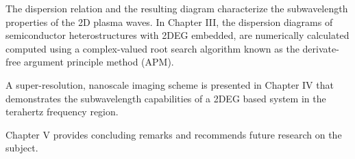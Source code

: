 \documentclass[12pt]{article}
\begin{document}
The dispersion relation and the resulting diagram characterize the subwavelength properties of the 2D plasma waves. In Chapter III, the dispersion diagrams of semiconductor heterostructures with 2DEG embedded, are numerically calculated computed using a complex-valued root search algorithm known as the derivate-free argument principle method (APM).

A super-resolution, nanoscale imaging scheme is presented in Chapter IV that demonstrates the subwavelength capabilities of a 2DEG based system in the terahertz frequency region.

Chapter V provides concluding remarks and recommends future research on the subject. 










\clearpage %
% 


\end{document}

